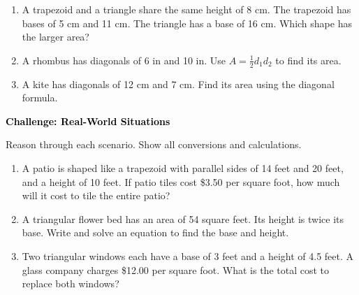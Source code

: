 \documentclass[12pt, letterpaper, fleqn]{article}
\begin{document}
\begin{enumerate}[itemsep=2.3cm, leftmargin=0.6cm]

\item A trapezoid and a triangle share the same height of 8 cm. The trapezoid has bases of 5 cm and 11 cm. The triangle has a base of 16 cm. Which shape has the larger area?

\vspace{2.2cm}

\item A rhombus has diagonals of 6 in and 10 in. Use $A = \frac{1}{2}d_1 d_2$ to find its area.

\vspace{2.2cm}

\item A kite has diagonals of 12 cm and 7 cm. Find its area using the diagonal formula.

\vspace{2.5cm}

\end{enumerate}

\newpage

\begin{tcolorbox}[colback=black!10]
\large\textcolor{black}{\textbf{Challenge: Real-World Situations}}
\end{tcolorbox}

\noindent
Reason through each scenario. Show all conversions and calculations.

\vspace{3mm}

\begin{enumerate}[itemsep=2.4cm, leftmargin=0.6cm]

\item A patio is shaped like a trapezoid with parallel sides of 14 feet and 20 feet, and a height of 10 feet. If patio tiles cost \$3.50 per square foot, how much will it cost to tile the entire patio?

\vspace{2.3cm}

\item A triangular flower bed has an area of 54 square feet. Its height is twice its base. Write and solve an equation to find the base and height.

\vspace{2.3cm}

\item Two triangular windows each have a base of 3 feet and a height of 4.5 feet. A glass company charges \$12.00 per square foot. What is the total cost to replace both windows?

\vspace{2.5cm}

\end{enumerate}
\end{document}
